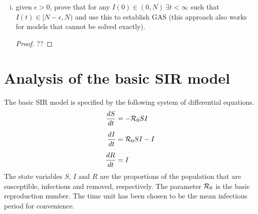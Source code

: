 \documentclass[12pt]{article}
\begin{document}
\begin{enumerate}[(a)]
\begin{enumerate}[(i)]
{\begin{proof}
{	This is the exact solution of ~\eqref{E:SI}. Taking the limit as $t \rightarrow \infty$ and using L'Hôpital's rule gives

	\begin{align}
		\lim_{t\to\infty} \frac{NI_0e^{\beta Nt}}{N+I_0(e^{\beta Nt} -1)} &= \lim_{t\to\infty} \frac{N^{\cancel 2} \cancel{\beta I_0e^{\beta Nt}}}{\cancel{N \beta I_0e^{\beta Nt}} } \\
													    &= N
	\end{align}
}
\end{proof}
}

\item given $\epsilon>0$, prove that for any $I(0)\in(0,N)\ \exists t<\infty$ such that $I(t)\in[N-\epsilon,N)$ and use this to establish GAS (this approach also works for models that cannot be solved exactly).

{\color{blue}
\begin{proof}
{\color{magenta}
	
	??
}
\end{proof}
}

\end{enumerate}
\end{enumerate}

\section{Analysis of the basic SIR  model}

The basic SIR model is specified by the following system of differential equations.
\begin{subequations}
\begin{align}
\frac{dS}{dt} &= -\R_0 SI \\
\noalign{\vspace{5pt}}
\frac{dI}{dt} &= \R_0 SI - I \\
\noalign{\vspace{5pt}}
\frac{dR}{dt} &= I
\end{align}
\end{subequations}
The state variables $S$, $I$ and $R$ are the proportions of the population that are susceptible, infectious and removed, respectively.  The parameter ${\cal R}_0$ is the basic reproduction number.  The time unit has been chosen to be the mean infectious period for convenience.
\end{document}
